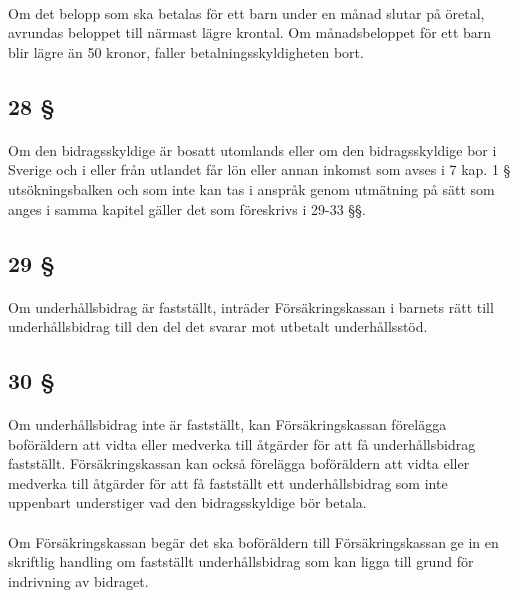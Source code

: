 \documentclass[a4paper,notitlepage,openany,10pt]{book}
\begin{document}
\paragraph*{}
Om det belopp som ska betalas för ett barn under en månad slutar på öretal, avrundas beloppet till närmast lägre krontal. Om månadsbeloppet för ett barn blir lägre än 50 kronor, faller betalningsskyldigheten bort.
\subsection*{28 §}
\paragraph*{}
Om den bidragsskyldige är bosatt utomlands eller om den bidragsskyldige bor i Sverige och i eller från utlandet får lön eller annan inkomst som avses i 7 kap. 1 § utsökningsbalken och som inte kan tas i anspråk genom utmätning på sätt som anges i samma kapitel gäller det som föreskrivs i 29-33 §§.
\subsection*{29 §}
\paragraph*{}
Om underhållsbidrag är fastställt, inträder Försäkringskassan i barnets rätt till underhållsbidrag till den del det svarar mot utbetalt underhållsstöd.
\subsection*{30 §}
\paragraph*{}
Om underhållsbidrag inte är fastställt, kan Försäkringskassan förelägga boföräldern att vidta eller medverka till åtgärder för att få underhållsbidrag fastställt. Försäkringskassan kan också förelägga boföräldern att vidta eller medverka till åtgärder för att få fastställt ett underhållsbidrag som inte uppenbart understiger vad den bidragsskyldige bör betala.
\paragraph*{}
Om Försäkringskassan begär det ska boföräldern till Försäkringskassan ge in en skriftlig handling om fastställt underhållsbidrag som kan ligga till grund för indrivning av bidraget.
\end{document}
